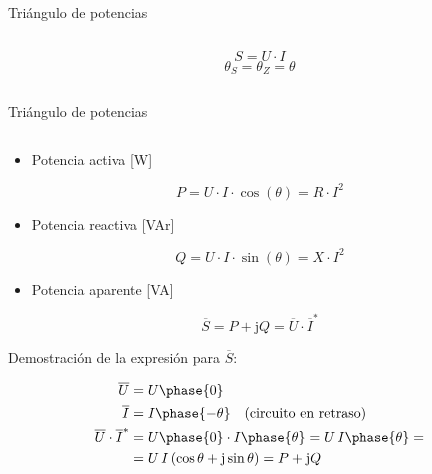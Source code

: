 \documentclass[aspectratio=169, usenames,svgnames,dvipsnames]{beamer}
\begin{document}
\begin{frame}{Triángulo de potencias}
\begin{columns}
\begin{column}{0.4\columnwidth}
    \[
        S = U \cdot I
    \]
    \[
        \theta_S = \theta_Z = \theta
    \]
    
    
    
    \end{column}
    \end{columns}
\end{frame}


\begin{frame}{Triángulo de potencias}
    \begin{columns} 
    \begin{column}{0.6\columnwidth}
    \vspace{2mm}
    \begin{itemize}
        \item Potencia activa [W]
    \end{itemize}
    \[  
        \boxed{P = U\cdot I\cdot\cos(\theta) = R \cdot I^2}
    \]
    
    \begin{itemize}
        \item Potencia reactiva [VAr]
    \end{itemize}
    \[
        \boxed{Q = U\cdot I\cdot\sin(\theta) = X \cdot I^2}
    \]
    
    \begin{itemize}
        \item Potencia aparente [VA]
    \end{itemize}
    \[
        \boxed{\overline{S} = P + \mathrm{j}Q = \overline{U} \cdot \overline{I}^*}
    \]
    
    \hspace{8mm}Demostración de la expresión para $\overline{S}$:

    \vspace{-7mm}
    {\begin{align*}
        \overline{U} &= U\phase{0}\\
        \overline{I} &= I\phase{-\theta} \quad \text{(circuito en retraso)}\\
        \overline{U}\cdot\overline{I}^* &= U\phase{0} \cdot I\phase{\theta} = U\,I\phase{\theta}=\\
        &=U\,I\, (\cos\theta + \mathrm{j} \sin\theta) = P + \mathrm{j} Q
    \end{align*}}
    \end{column}
    

\end{columns}
\end{frame}
\end{document}
